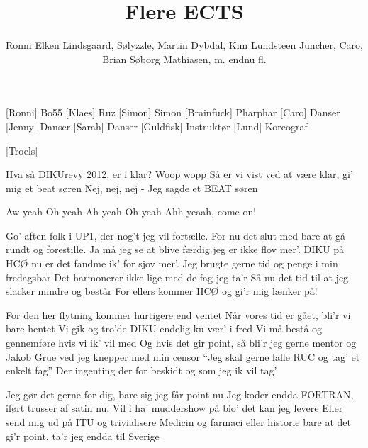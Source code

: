 \documentclass[a4paper,11pt]{article}
\title{Flere ECTS}
\author{Ronni Elken Lindsgaard, Sølyzzle, Martin Dybdal, Kim Lundsteen Juncher, Caro, Brian Søborg Mathiasen, m. endnu fl.}
\begin{document}
 \maketitle

 \begin{roles}
   [Ronni] Bo55
   [Klaes] Ruz
   [Simon] Simon
   [Brainfuck] Pharphar
   [Caro] Danser
   [Jenny] Danser
   [Sarah] Danser
   [Guldfisk] Instruktør
   [Lund] Koreograf
 \end{roles}

\begin{props}
  [Troels]
\end{props}

\begin{song}
 Hva så DIKUrevy 2012, er i klar?
 Woop wopp
 Så er vi vist ved at være klar, gi' mig et beat søren
 Nej, nej, nej - Jeg sagde et BEAT søren

 Aw yeah
 Oh yeah
 Ah yeah
 Oh yeah
 Ahh yeaah, come on!


Go' aften folk i UP1, der nog't jeg vil fortælle.
For nu det slut med bare at gå rundt og forestille.
Ja må jeg se at blive færdig jeg er ikke flov mer'.
DIKU på HCØ nu er det fandme ik' for sjov mer'.
Jeg brugte gerne tid og penge i min fredagsbar
Det harmonerer ikke lige med de fag jeg ta'r
Så nu det tid til at jeg slacker mindre og består
For ellers kommer HCØ og gi'r mig lænker på!

For den her flytning kommer hurtigere end ventet
Når vores tid er gået, bli'r vi bare hentet
Vi gik og tro'de DIKU endelig ku vær' i fred
Vi må bestå og gennemføre hvis vi ik' vil med
Og hvis det gir point, så bli'r jeg gerne mentor
og Jakob Grue ved jeg knepper med min censor
“Jeg skal gerne lalle RUC og tag' et enkelt fag”
Der ingenting der for beskidt og som jeg ik vil tag'

Jeg gør det gerne for dig, bare sig jeg får point nu
Jeg koder endda FORTRAN, iført trusser af satin nu.
Vil i ha' muddershow på bio' det kan jeg levere
Eller send mig ud på ITU og trivialisere
Medicin og farmaci eller  historie
bare at det gi'r point, ta'r jeg endda til Sverige


\end{song}
\end{document}
